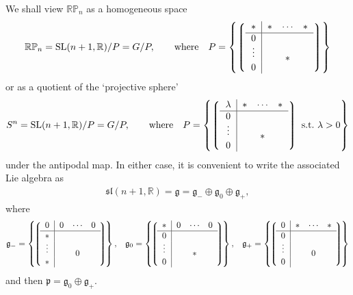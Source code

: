\documentclass[11pt]{article}
\begin{document}
We shall view ${\mathbb{RP}}_n$ as a homogeneous space
\[{\mathbb{RP}}_n={\mathrm{SL}}(n+1,{\mathbb{R}})/P=G/P,\qquad\mbox{where}\quad
P=\left\{
\left\lgroup\begin{tabular}{c|ccc}$\ast$&$\ast$&$\!\cdots\!$&$\ast$\\ \hline
$0$\\
\raisebox{2pt}[15pt]{$\vdots$}&&
\raisebox{-2pt}[0pt][0pt]{\makebox[0pt]{\Huge$\ast$}}\\
$0$\end{tabular}\right\rgroup\right\}\]
or as a quotient of the `projective sphere'
\[S^n={\mathrm{SL}}(n+1,{\mathbb{R}})/P=G/P,\qquad\mbox{where}\quad
P=\left\{
\left\lgroup\begin{tabular}{c|ccc}$\lambda$&$\ast$&$\!\cdots\!$&$\ast$\\ \hline
$0$\\
\raisebox{2pt}[15pt]{$\vdots$}&&
\raisebox{-2pt}[0pt][0pt]{\makebox[0pt]{\Huge$\ast$}}\\
$0$\end{tabular}\right\rgroup\mbox{ s.t.\ }\lambda>0\right\}\]
under the antipodal map. In either case, it is convenient to write the
associated Lie algebra as
\begin{gather}\label{graded}
{\mathfrak{sl}}(n+1,{\mathbb{R}})={\mathfrak{g}}=
{\mathfrak{g}}_-\oplus{\mathfrak{g}}_0\oplus{\mathfrak{g}}_+,
\end{gather}
where{\samepage
\begin{gather*}
{\mathfrak{g}}_-=\left\{\!
\left\lgroup\!\begin{tabular}{c|ccc}$0$&$0$&$\!\cdots\!$&$0$\\ \hline
$\ast$\\
\raisebox{2pt}[15pt]{$\vdots$}&&
\raisebox{-2pt}[0pt][0pt]{\makebox[0pt]{\Huge$0$}}\\
$\ast$\end{tabular}\!\right\rgroup\!\right\},\!\quad
{\mathfrak{g}}_0=\left\{\!
\left\lgroup\!\begin{tabular}{c|ccc}$\ast$&$0$&$\!\cdots\!$&$0$\\ \hline
$0$\\
\raisebox{2pt}[15pt]{$\vdots$}&&
\raisebox{-2pt}[0pt][0pt]{\makebox[0pt]{\Huge$\ast$}}\\
$0$\end{tabular}\!\right\rgroup\!\right\},\!\quad
{\mathfrak{g}}_+=\left\{\!
\left\lgroup\!\begin{tabular}{c|ccc}$0$&$\ast$&$\!\cdots\!$&$\ast$\\ \hline
$0$\\
\raisebox{2pt}[15pt]{$\vdots$}&&
\raisebox{-2pt}[0pt][0pt]{\makebox[0pt]{\Huge$0$}}\\
$0$\end{tabular}\!\right\rgroup\!\right\}
\end{gather*}
and then ${\mathfrak{p}}={\mathfrak{g}}_0\oplus{\mathfrak{g}}_+$.}
\end{document}
